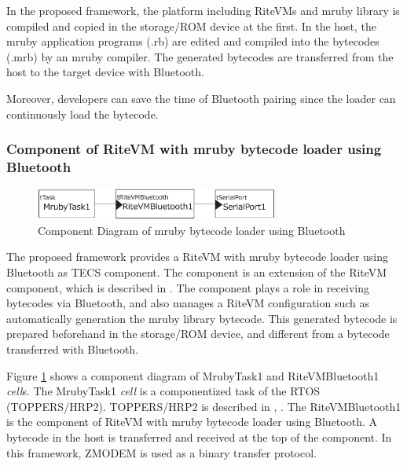 \documentclass{sig-alternate-05-2015}
\begin{document}
In the proposed framework, the platform including RiteVMs and mruby library is compiled and copied in the storage/ROM device at the first.
In the host, the mruby application programs (.rb) are edited and compiled into the bytecodes (.mrb) by an mruby compiler.
The generated bytecodes are transferred from the host to the target device with Bluetooth.

Moreover, developers can save the time of Bluetooth pairing since the loader can continuously load the bytecode.


\subsubsection{Component of RiteVM with mruby bytecode loader using Bluetooth}
\begin{figure}[t]
    \centering
    \includegraphics[width=8cm,clip]{figure/component_bluetooth.eps}
    \caption{Component Diagram of mruby bytecode loader using Bluetooth}
    \label{fig:component_bluetooth}
\end{figure}
The proposed framework provides a RiteVM with mruby bytecode loader using Bluetooth as TECS component.
The component is an extension of the RiteVM component, which is described in \cite{par:mrubyonTECS}.
The component plays a role in receiving bytecodes via Bluetooth, and also manages a RiteVM configuration such as automatically generation the mruby library bytecode.
This generated bytecode is prepared beforehand in the storage/ROM device, and different from a bytecode transferred with Bluetooth.

Figure \ref{fig:component_bluetooth} shows a component diagram of MrubyTask1 and RiteVMBluetooth1 {\it cell}s.
The MrubyTask1 {\it cell} is a componentized task of the RTOS (TOPPERS/HRP2).
TOPPERS/HRP2 is described in \cite{url:HRP2}, \cite{par:hr-tecs}.
The RiteVMBluetooth1 is the component of RiteVM with mruby bytecode loader using Bluetooth.
A bytecode in the host is transferred and received at the top of the component.
In this framework, ZMODEM \cite{par:zmodem} is used as a binary transfer protocol.
\end{document}
